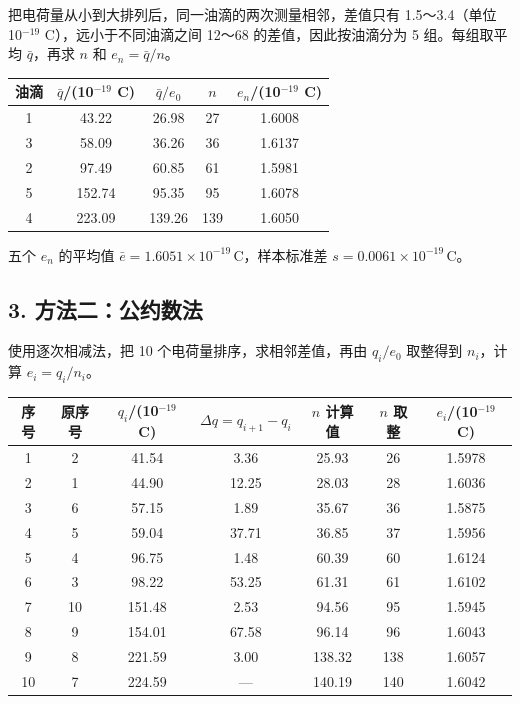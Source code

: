 把电荷量从小到大排列后，同一油滴的两次测量相邻，差值只有 1.5～3.4（单位 10$^{-19}$ C），远小于不同油滴之间 12～68 的差值，因此按油滴分为 5 组。每组取平均 $\bar q$，再求 $n$ 和 $e_n=\bar q/n$。

\begin{center}\small\setlength{\tabcolsep}{4pt}
\begin{tabular}{ccccc}
\toprule
油滴 & $\bar q$/(10$^{-19}$ C) & $\bar q/e_0$ & $n$ & $e_n$/(10$^{-19}$ C) \\
\midrule
1 & 43.22 & 26.98 & 27 & 1.6008 \\
3 & 58.09 & 36.26 & 36 & 1.6137 \\
2 & 97.49 & 60.85 & 61 & 1.5981 \\
5 & 152.74 & 95.35 & 95 & 1.6078 \\
4 & 223.09 & 139.26 & 139 & 1.6050 \\
\bottomrule\end{tabular}\end{center}

五个 $e_n$ 的平均值 $\bar e=1.6051\times10^{-19}\,\mathrm{C}$，样本标准差 $s=0.0061\times10^{-19}\,\mathrm{C}$。

\subsection*{3. 方法二：公约数法}

使用逐次相减法，把 10 个电荷量排序，求相邻差值，再由 $q_i/e_0$ 取整得到 $n_i$，计算 $e_i=q_i/n_i$。

\begin{center}\small\setlength{\tabcolsep}{4pt}
\begin{tabular}{ccccccc}
\toprule
序号 & 原序号 & $q_i$/(10$^{-19}$ C) & $\Delta q=q_{i+1}-q_i$ & $n$ 计算值 & $n$ 取整 & $e_i$/(10$^{-19}$ C) \\
\midrule
1 & 2 & 41.54 & 3.36 & 25.93 & 26 & 1.5978 \\
2 & 1 & 44.90 & 12.25 & 28.03 & 28 & 1.6036 \\
3 & 6 & 57.15 & 1.89 & 35.67 & 36 & 1.5875 \\
4 & 5 & 59.04 & 37.71 & 36.85 & 37 & 1.5956 \\
5 & 4 & 96.75 & 1.48 & 60.39 & 60 & 1.6124 \\
6 & 3 & 98.22 & 53.25 & 61.31 & 61 & 1.6102 \\
7 & 10 & 151.48 & 2.53 & 94.56 & 95 & 1.5945 \\
8 & 9 & 154.01 & 67.58 & 96.14 & 96 & 1.6043 \\
9 & 8 & 221.59 & 3.00 & 138.32 & 138 & 1.6057 \\
10 & 7 & 224.59 & — & 140.19 & 140 & 1.6042 \\
\bottomrule\end{tabular}\end{center}

